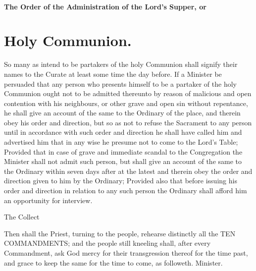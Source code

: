 \subsubsection{The Order of the Administration of the Lord's Supper, or}
\chapter{Holy Communion.}
So many as intend to be partakers of the holy Communion shall signify their names to the Curate at least some time the day before.
If a Minister be persuaded that any person who presents himself to be a partaker of the holy Communion ought not to be admitted thereunto by reason of malicious and open contention with his neighbours, or other grave and open sin without repentance, he shall give an account of the same to the Ordinary of the place, and therein obey his order and direction, but so as not to refuse the Sacrament to any person until in accordance with such order and direction he shall have called him and advertised him that in any wise he presume not to come to the Lord's Table; Provided that in case of grave and immediate scandal to the Congregation the Minister shall not admit such person, but shall give an account of the same to the Ordinary within seven days after at the latest and therein obey the order and direction given to him by the Ordinary; Provided also that before issuing his order and direction in relation to any such person the Ordinary shall afford him an opportunity for interview.


The Collect

Then shall the Priest, turning to the people, rehearse distinctly all the TEN COMMANDMENTS; and the people still kneeling shall, after every Commandment, ask God mercy for their transgression thereof for the time past, and grace to keep the same for the time to come, as followeth.
Minister.


